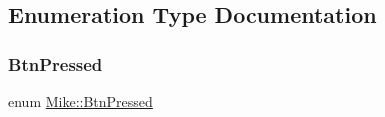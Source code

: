 \subsection{Enumeration Type Documentation}
\mbox{\label{namespace_mike_a9dd611fa3c671b02e477e6b21465cc66}} 
\subsubsection{\texorpdfstring{Btn\+Pressed}{BtnPressed}}
{\footnotesize\ttfamily enum \hyperlink{namespace_mike_a9dd611fa3c671b02e477e6b21465cc66}{Mike\+::\+Btn\+Pressed}\hspace{0.3cm}{\ttfamily [strong]}}

